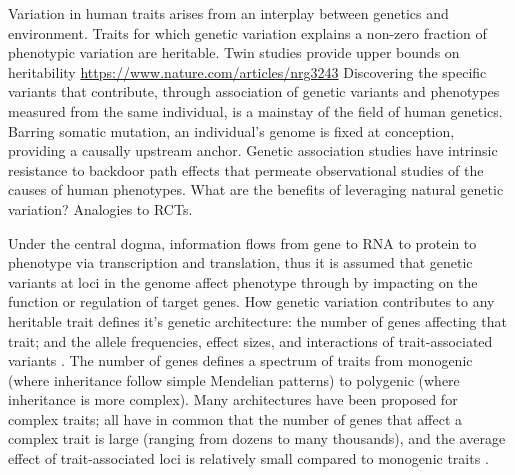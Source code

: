 \begin{outline}
\1 Variation in human traits arises from an interplay between genetics and environment.
Traits for which genetic variation explains a non-zero fraction of phenotypic variation are heritable.
    \2 Twin studies provide upper bounds on heritability \url{https://www.nature.com/articles/nrg3243}
\1 Discovering the specific variants that contribute, through association of genetic variants and phenotypes measured from the same individual, is a mainstay of the field of human genetics.
Barring somatic mutation, an individual's genome is fixed at conception, providing a causally upstream anchor.
Genetic association studies have intrinsic resistance to backdoor path effects that permeate observational studies of the causes of human phenotypes.
    \2 What are the benefits of leveraging natural genetic variation? Analogies to RCTs.

\1 Under the central dogma, information flows from gene to RNA to protein to phenotype via transcription and translation, thus it is assumed that genetic variants at loci in the genome affect phenotype through by impacting on the function or regulation of target genes.
How genetic variation contributes to any heritable trait defines it's genetic architecture: the number of genes affecting that trait; and the allele frequencies, effect sizes, and interactions of trait-associated variants \autocite{visscher2019Fisher1918Paper}.
The number of genes defines a spectrum of traits from monogenic (where inheritance follow simple Mendelian patterns) to polygenic (where inheritance is more complex).
Many architectures have been proposed for complex traits; all have in common that the number of genes that affect a complex trait is large (ranging from dozens to many thousands),
and the average effect of trait-associated loci is relatively small compared to monogenic traits \autocite{gibson2011RareCommonVariants,boyle2017ExpandedViewComplex}.


\end{outline}
